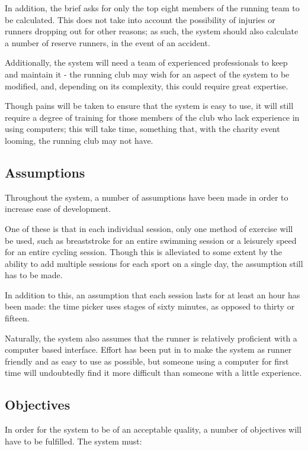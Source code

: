 \documentclass{article}[12pt,a4paper]
\begin{document}
In addition, the brief asks for only the top eight members of the running team to be calculated. This does not take into account the possibility of injuries or runners dropping out for other reasons; as such, the system should also calculate a number of reserve runners, in the event of an accident.

Additionally, the system will need a team of experienced professionals to keep and maintain it - the running club may wish for an aspect of the system to be modified, and, depending on its complexity, this could require great expertise.

Though pains will be taken to ensure that the system is easy to use, it will still require a degree of training for those members of the club who lack experience in using computers; this will take time, something that, with the charity event looming, the running club may not have.

\subsection{Assumptions}
Throughout the system, a number of assumptions have been made in order to increase ease of development. 

One of these is that in each individual session, only one method of exercise will be used, such as breaststroke for an entire swimming session or a leisurely speed for an entire cycling session. Though this is alleviated to some extent by the ability to add multiple sessions for each sport on a single day, the assumption still has to be made. 

In addition to this, an assumption that each session lasts for at least an hour has been made: the time picker uses stages of sixty minutes, as opposed to thirty or fifteen.

Naturally, the system also assumes that the runner is relatively proficient with a computer based interface. Effort has been put in to make the system as runner friendly and as easy to use as possible, but someone using a computer for first time will undoubtedly find it more difficult than someone with a little experience.

\subsection{Objectives}
In order for the system to be of an acceptable quality, a number of objectives will have to be fulfilled. The system must:
\end{document}
